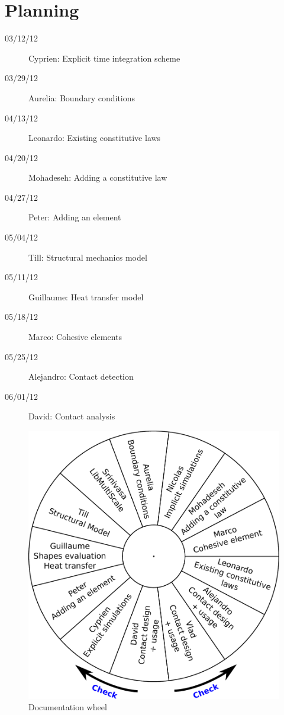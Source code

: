 \chapter{Planning}

\begin{description}
\item[03/12/12] Cyprien: Explicit time integration scheme
\item[03/29/12] Aurelia: Boundary conditions
\item[04/13/12] Leonardo: Existing constitutive laws
\item[04/20/12] Mohadeseh: Adding a constitutive law
\item[04/27/12] Peter: Adding an element
\item[05/04/12] Till: Structural mechanics model
\item[05/11/12] Guillaume: Heat transfer model
\item[05/18/12] Marco: Cohesive elements
\item[05/25/12] Alejandro: Contact detection
\item[06/01/12] David: Contact analysis
\end{description}

\begin{figure}[!htb]
  \centering
  \includegraphics[width=\linewidth]{figures/doc_wheel}
  \caption{Documentation wheel\label{fig:doc_wheel}}
\end{figure}
